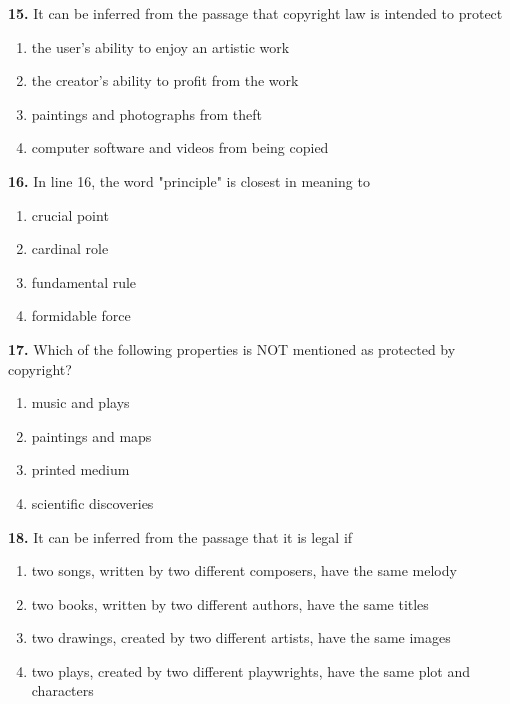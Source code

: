 \documentclass[12pt]{article}
\begin{document}
\par
\vspace{0.25\baselineskip}
\noindent\textbf{15.} It can be inferred from the passage that copyright law is intended to protect
\begin{enumerate}[label=(\Alph*),leftmargin=*,itemsep=0.2em]
\item the user's ability to enjoy an artistic work
\item the creator's ability to profit from the work
\item paintings and photographs from theft
\item computer software and videos from being copied
\end{enumerate}
\par
\vspace{0.25\baselineskip}
\noindent\textbf{16.} In line 16, the word "principle" is closest in meaning to
\begin{enumerate}[label=(\Alph*),leftmargin=*,itemsep=0.2em]
\item crucial point
\item cardinal role
\item fundamental rule
\item formidable force
\end{enumerate}
\par
\vspace{0.25\baselineskip}
\noindent\textbf{17.} Which of the following properties is NOT mentioned as protected by copyright?
\begin{enumerate}[label=(\Alph*),leftmargin=*,itemsep=0.2em]
\item music and plays
\item paintings and maps
\item printed medium
\item scientific discoveries
\end{enumerate}
\par
\vspace{0.25\baselineskip}
\noindent\textbf{18.} It can be inferred from the passage that it is legal if
\begin{enumerate}[label=(\Alph*),leftmargin=*,itemsep=0.2em]
\item two songs, written by two different composers, have the same melody
\item two books, written by two different authors, have the same titles
\item two drawings, created by two different artists, have the same images
\item two plays, created by two different playwrights, have the same plot and characters
\end{enumerate}
\end{document}
